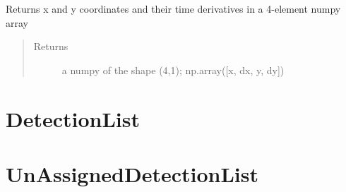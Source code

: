 \documentclass[letterpaper,10pt,english]{Reference manual}
\begin{document}
\begin{fulllineitems}
\begin{fulllineitems}
\label{\detokenize{datacontainers:data_containers.TrackPoint.get_array}}
Returns x and y coordinates and their time derivatives in a 4-element numpy array
\begin{quote}\begin{description}
\item[{Returns}] \leavevmode
a numpy of the shape (4,1); np.array({[}x, dx, y, dy{]})

\end{description}\end{quote}

\end{fulllineitems}


\end{fulllineitems}



\section{DetectionList}
\label{\detokenize{datacontainers:detectionlist}}

\begin{fulllineitems}
\label{\detokenize{datacontainers:data_containers.DetectionList}}
\end{fulllineitems}



\section{UnAssignedDetectionList}
\label{\detokenize{datacontainers:unassigneddetectionlist}}
\end{document}
